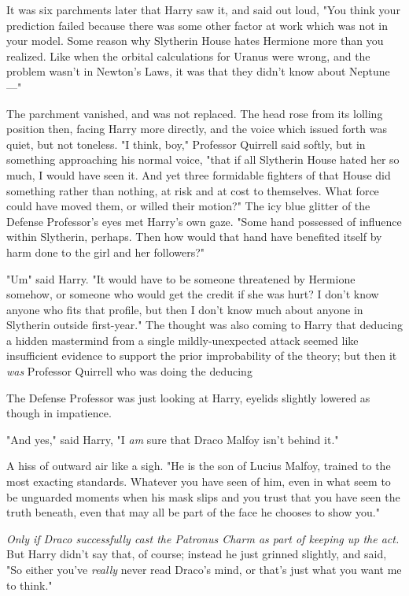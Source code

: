 It was six parchments later that Harry saw it, and said out loud, "You think
your prediction failed because there was some other factor at work which was
not in your model. Some reason why Slytherin House hates Hermione more than you
realized. Like when the orbital calculations for Uranus were wrong, and the
problem wasn't in Newton's Laws, it was that they didn't know about Neptune---"

The parchment vanished, and was not replaced. The head rose from its lolling
position then, facing Harry more directly, and the voice which issued forth was
quiet, but not toneless. "I think, boy," Professor Quirrell said softly, but in
something approaching his normal voice, "that if all Slytherin House hated her
so much, I would have seen it. And yet three formidable fighters of that House
did something rather than nothing, at risk and at cost to themselves. What
force could have moved them, or willed their motion?" The icy blue glitter of
the Defense Professor's eyes met Harry's own gaze. "Some hand possessed of
influence within Slytherin, perhaps. Then how would that hand have benefited
itself by harm done to the girl and her followers?"

"Um{\el}" said Harry. "It would have to be someone threatened by Hermione
somehow, or someone who would get the credit if she was hurt? I don't know
anyone who fits that profile, but then I don't know much about anyone in
Slytherin outside first-year." The thought was also coming to Harry that
deducing a hidden mastermind from a single mildly-unexpected attack seemed like
insufficient evidence to support the prior improbability of the theory; but
then it \emph{was} Professor Quirrell who was doing the deducing{\el}

The Defense Professor was just looking at Harry, eyelids slightly lowered as
though in impatience.

"And yes," said Harry, "I \emph{am} sure that Draco Malfoy isn't behind it."

A hiss of outward air like a sigh. "He is the son of Lucius Malfoy, trained to
the most exacting standards. Whatever you have seen of him, even in what seem
to be unguarded moments when his mask slips and you trust that you have seen
the truth beneath, even that may all be part of the face he chooses to show
you."

\emph{Only if Draco successfully cast the Patronus Charm as part of keeping up
the act.} But Harry didn't say that, of course; instead he just grinned
slightly, and said, "So either you've \emph{really} never read Draco's mind, or
that's just what you want me to think."

